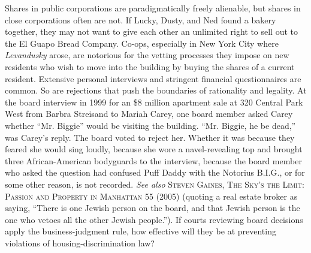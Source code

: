 \item Shares in public corporations are paradigmatically freely alienable, but
shares in close corporations often are not. If Lucky, Dusty, and Ned found a
bakery together, they may not want to give each other an unlimited right to sell
out to the El Guapo Bread Company. Co-ops, especially in New York City where
\textit{Levandusky} arose, are notorious for the vetting processes they impose
on new residents who wish to move into the building by buying the shares of a
current resident. Extensive personal interviews and stringent financial
questionnaires are common. So are rejections that push the boundaries of
rationality and legality. At the board interview in 1999 for an \$8 million
apartment sale at 320 Central Park West from Barbra Streisand to Mariah Carey,
one board member asked Carey whether ``Mr. Biggie'' would be visiting the
building. ``Mr. Biggie, he be dead,'' was Carey's reply. The board voted to
reject her. Whether it was because they feared she would sing loudly, because
she wore a navel-revealing top and brought three African-American bodyguards to
the interview, because the board member who asked the question had confused Puff
Daddy with the Notorius B.I.G., or for some other reason, is not recorded.
\textit{See also} \textsc{Steven Gaines, The Sky's the Limit: Passion and
Property in Manhattan} 55 (2005) (quoting a real estate broker as saying,
``There is one Jewish person on the board, and that Jewish person is the one who
vetoes all the other Jewish people.''). If courts reviewing board decisions
apply the business-judgment rule, how effective will they be at preventing
violations of housing-discrimination law?

